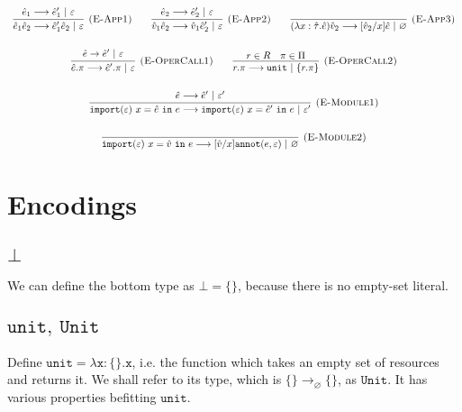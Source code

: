\documentclass{llncs}
\newcommand{\keywadj}[1]{\mathtt{#1}}
\newcommand{\keyw}[1]{\keywadj{#1}~}
\newcommand{\kw}[1]{\keyw{ #1 }}
\newcommand{\kwa}[1]{\keywadj{ #1 }}
\newcommand{\unit}[0]{ \kwa{unit} }
\newcommand{\Unit}[0]{ \kwa{Unit} }
\begin{document}
\[
\begin{array}{c}

\infer[\textsc{(E-App1)}]
	{\hat e_1 \hat e_2 \longrightarrow \hat e_1' \hat e_2~|~\varepsilon}
	{\hat e_1 \longrightarrow \hat e_1'~|~\varepsilon}
	~~~~~~
\infer[\textsc{(E-App2)}]
	{\hat v_1 \hat e_2 \longrightarrow \hat v_1 \hat e_2'~|~\varepsilon} 
	{\hat e_2 \longrightarrow \hat e_2'~|~\varepsilon}
~~~~~~
\infer[\textsc{(E-App3)}]
	{ (\lambda x: \hat \tau.\hat e) \hat v_2 \longrightarrow [\hat v_2/x]\hat e~|~\varnothing }
	{}\\[4ex]
	
\infer[\textsc{(E-OperCall1)}]
	{\hat e.\pi \longrightarrow \hat e'.\pi~|~\varepsilon }
	{\hat e \rightarrow \hat e'~|~\varepsilon}
		
	~~~~~~
	
\infer[\textsc{(E-OperCall2)}]
	{r.\pi \longrightarrow \kwa{unit}~|~\{ r.\pi \} }
	{r \in R & \pi \in \Pi}
	 \\[4ex]
	 
\infer[\textsc{(E-Module1)}]
	{\kwa{import}(\varepsilon)~x = \hat e~\kw{in} e \longrightarrow \kwa{import}(\varepsilon)~x = \hat e'~\kw{in} e~|~\varepsilon'}
	{\hat e \longrightarrow \hat e'~|~\varepsilon'}\\[4ex]

\infer[\textsc{(E-Module2)}]
	{\kwa{import}(\varepsilon)~x = \hat v~\kw{in} e \longrightarrow [\hat v/x]\kwa{annot}(e, \varepsilon)~|~\varnothing}
	{}

\end{array}
\]


\section{Encodings}

\subsection{$\bot$}
We can define the bottom type as $\kwa{\bot = \{\}}$, because there is no empty-set literal.

\subsection{$\unit,~\Unit$}

\noindent
Define $\kwa{unit = \lambda x: \{\}.x}$, i.e. the function which takes an empty set of resources and returns it. We shall refer to its type, which is $\kwa{\{\} \rightarrow_{\varnothing} \{\}}$, as $\Unit$. It has various properties befitting $\unit$.
\end{document}
